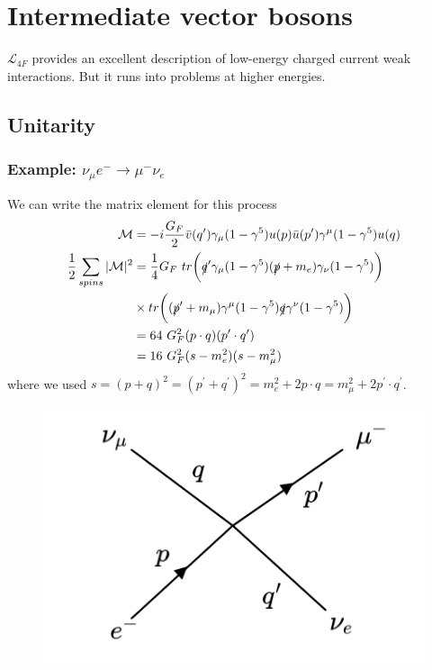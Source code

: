 
\section{Intermediate vector bosons}
$\mathcal{L}_{4F}$ provides an excellent description of low-energy charged current weak interactions. But it runs into problems at higher energies.
\subsection{Unitarity}
\subsubsection{Example:  $\nu_\mu e^- \to \mu^- \nu_e$}
We can write the matrix element for this process
\newline
\begin{equation}
\begin{split}
\mathcal{M} &= -i \frac{G_F}{2} \bar{v}(q^\prime)\gamma_\mu(1-\gamma^5)u(p) \bar{u}(p^\prime)\gamma^\mu(1-\gamma^5)u(q) \\
 \frac{1}{2}\sum_{spins}|\mathcal{M}|^2 &= \frac{1}{4} G_F\ tr\bigg(\slashed{q}^\prime \gamma_\mu(1-\gamma^5)(\slashed{p}+m_e)\gamma_\nu(1-\gamma^5)\bigg) \\
 &\times tr\bigg((\slashed{p}^\prime + m_\mu)\gamma^\mu(1-\gamma^5)\slashed{q}\gamma^\nu(1-\gamma^5)\bigg)\\
 &= 64\ G_F^2(p \cdot q)(p^\prime \cdot q^\prime) \\
 &= 16\ G_F^2(s-m_e^2)(s-m_\mu^2)
\end{split}
\end{equation}
where we used $s = (p+q)^2 = (p^\prime + q^\prime)^2 = m_e^2 + 2 p \cdot q = m_\mu^2 + 2p^\prime \cdot q^\prime$. 
\begin{figure}
  \centering
  \includegraphics[width=\linewidth]{figs/diag_5.png}
\end{figure}
